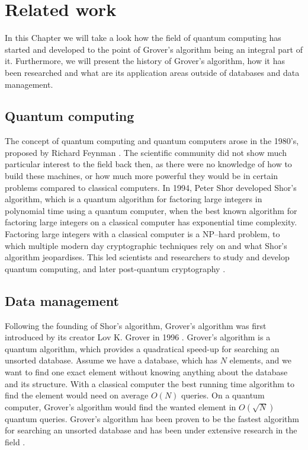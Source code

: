 \documentclass[english,oneside,openright]{UH_DS_report}
\begin{document}
\chapter{Related work}
\label{chapter:relatedwork}

In this Chapter we will take a look how the field of quantum computing has started and developed to the point of Grover's algorithm being an integral part of it. Furthermore, we will present the history of Grover's algorithm, how it has been researched and what are its application areas outside of databases and data management.

\section{Quantum computing}

The concept of quantum computing and quantum computers arose in the 1980's, proposed by Richard Feynman \cite{introtoqc}. The scientific community did not show much particular interest to the field back then, as there were no knowledge of how to build these machines, or how much more powerful they would be in certain problems compared to classical computers. In 1994, Peter Shor developed Shor's algorithm, which is a quantum algorithm for factoring large integers in polynomial time using a quantum computer, when the best known algorithm for factoring large integers on a classical computer has exponential time complexity. Factoring large integers with a classical computer is a NP--hard problem, to which multiple modern day cryptographic techniques rely on and what Shor's algorithm jeopardises. This led scientists and researchers to study and develop quantum computing, and later post-quantum cryptography \cite{introtoqc, qcdb}.

\section{Data management}

Following the founding of Shor's algorithm, Grover's algorithm was first introduced by its creator Lov K. Grover in 1996 \cite{grover1996fast}. Grover's algorithm is a quantum algorithm, which provides a quadratical speed-up for searching an unsorted database. Assume we have a database, which has $N$ elements, and we want to find one exact element without knowing anything about the database and its structure. With a classical computer the best running time algorithm to find the element would need on average $O(N)$ queries. On a quantum computer, Grover's algorithm would find the wanted element in $O(\sqrt{N})$ quantum queries. Grover's algorithm has been proven to be the fastest algorithm for searching an unsorted database \cite{giri2017review, introtoqc} and has been under extensive research in the field \cite{giri2017review}.
\end{document}
